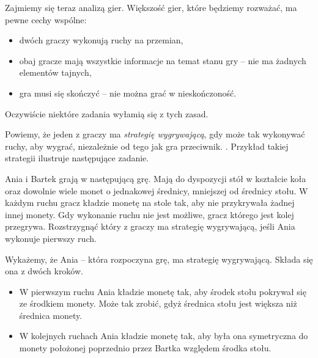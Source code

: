 

\noindent
Zajmiemy się teraz analizą gier. Większość gier, które będziemy rozważać, ma pewne cechy wspólne:
\begin{itemize}
	\item dwóch graczy wykonują ruchy na przemian,
	\item obaj gracze mają wszystkie informacje na temat stanu gry -- nie ma żadnych elementów tajnych,
	\item gra musi się skończyć -- nie można grać w nieskończoność.
\end{itemize}
Oczywiście niektóre zadania wyłamią się z tych zasad.

\vspace{10px}
\noindent
Powiemy, że jeden z graczy ma \textit{strategię wygrywającą}, gdy może tak wykonywać ruchy, aby wygrać, niezależnie od tego jak gra przeciwnik. . Przykład takiej strategii ilustruje następujące zadanie.

\vspace{10px}



\noindent
Ania i Bartek grają w następującą grę. Mają do dyspozycji stół w kształcie koła oraz dowolnie wiele monet o jednakowej średnicy, mniejszej od średnicy stołu. W każdym ruchu gracz kładzie monetę na stole tak, aby nie przykrywała żadnej innej monety. Gdy wykonanie ruchu nie jest możliwe, gracz którego jest kolej przegrywa. Rozstrzygnąć który z graczy ma strategię wygrywającą, jeśli Ania wykonuje pierwszy ruch.

\vspace{5px}


\noindent
Wykażemy, że Ania -- która rozpoczyna grę, ma strategię wygrywającą. Składa się ona z dwóch kroków.

\begin{itemize}
	\item W pierwszym ruchu Ania kładzie monetę tak, aby środek stołu pokrywał się ze środkiem monety. Może tak zrobić, gdyż średnica stołu jest większa niż średnica monety.
	\item W kolejnych ruchach Ania kładzie monetę tak, aby była ona symetryczna do monety położonej poprzednio przez Bartka względem środka stołu.
\end{itemize}

